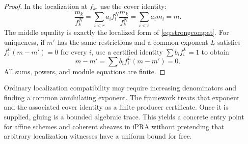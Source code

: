 \begin{proof}
In the localization at \(f_k\), use the cover identity:
\[
 \frac{m_k}{f_k^N}
 =\sum_{i<r}a_i f_i^N\frac{m_k}{f_k^N}
 =\sum_{i<r}a_i m_i
 =m.
\]
The middle equality is exactly the localized form of
\eqref{eq:strongcompat}.  For uniqueness, if \(m'\) has the same restrictions
and a common exponent \(L\) satisfies
\(f_i^L(m-m')=0\) for every \(i\), use a certified identity
\(\sum b_i f_i^L=1\) to obtain
\[
 m-m'=\sum b_i f_i^L(m-m')=0.
\]
All sums, powers, and module equations are finite.
\end{proof}

Ordinary localization compatibility may require increasing denominators and
finding a common annihilating exponent.  The framework treats that exponent
and the associated cover identity as a finite producer certificate.  Once it
is supplied, gluing is a bounded algebraic trace.  This yields a concrete entry
point for affine schemes and coherent sheaves in iPRA without pretending that
arbitrary localization witnesses have a uniform bound for free.
